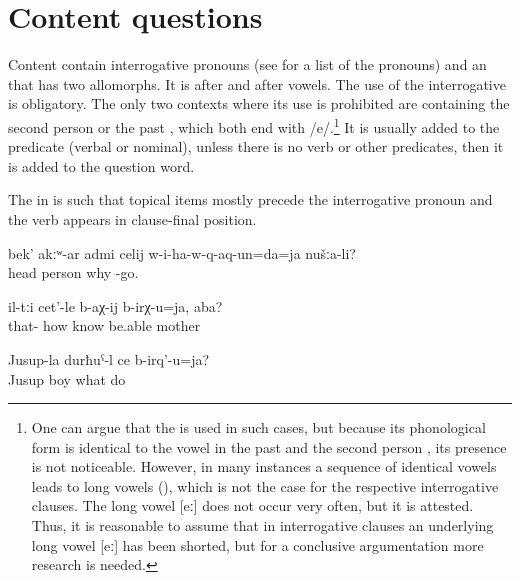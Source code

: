 
\section{Content questions}
\label{sec:Content questions}

Content  contain interrogative pronouns (see  for a list of the pronouns) and an  that has two allomorphs. It is  after  and  after vowels. The use of the interrogative  is obligatory. The only two contexts where its use is prohibited are  containing the second person   or the past  , which both end with /e/.\footnote{One can argue that the   is used in such cases, but because its phonological form is identical to the vowel in the past  and the second person , its presence is not noticeable. However, in many instances a sequence of identical vowels leads to long vowels (), which is not the case for the respective interrogative clauses. The long vowel [eː] does not occur very often, but it is attested. Thus, it is reasonable to assume that in interrogative clauses an underlying long vowel [eː] has been shorted, but for a conclusive argumentation more research is needed.} It is usually added to the predicate (verbal or nominal), unless there is no verb or other predicates, then it is added to the question word.

The  in  is such that topical items mostly precede the interrogative pronoun and the verb appears in clause-final position.

\begin{exe}
	\ex	\label{ex:‎Why did we send a man without a head there into (the cave)}
	\gll	bek'	akːʷ-ar	admi	celij	w-i-ha-w-q-aq-un=da=ja	nušːa-li?\\
		head		person	why	-go.	\\
	\glt	{}

	\ex	\label{ex:‎‎‎How can you get to know them, mother}
	\gll	il-tːi	cet'-le	b-aχ-ij	b-irχ-u=ja,	aba?\\
		that-	how	know	be.able	mother\\
	\glt	{}

	\ex	\label{ex:What does Jusup's son do}
	\gll	Jusup-la	durħuˁ-l	ce	b-irq'-u=ja?\\
		Jusup	boy	what	do\\
	\glt	{}
\end{exe}

